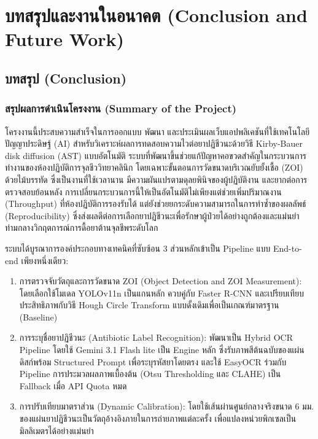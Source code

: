﻿%
\chapter{บทสรุปและงานในอนาคต (Conclusion and Future Work)}

\section{บทสรุป (Conclusion)}
\label{sec:conclusion}

\subsection{สรุปผลการดำเนินโครงงาน (Summary of the Project)}

โครงงานนี้ประสบความสำเร็จในการออกแบบ พัฒนา และประเมินผลเว็บแอปพลิเคชันที่ใช้เทคโนโลยีปัญญาประดิษฐ์ (AI) สำหรับวิเคราะห์ผลการทดสอบความไวต่อยาปฏิชีวนะด้วยวิธี Kirby-Bauer disk diffusion (AST) แบบอัตโนมัติ ระบบที่พัฒนาขึ้นช่วยแก้ปัญหาคอขวดสำคัญในกระบวนการทำงานของห้องปฏิบัติการจุลชีววิทยาคลินิก โดยเฉพาะขั้นตอนการวัดขนาดบริเวณยับยั้งเชื้อ (ZOI) ด้วยไม้บรรทัด ซึ่งเป็นงานที่ใช้เวลานาน มีความผันแปรตามดุลยพินิจของผู้ปฏิบัติงาน และยากต่อการตรวจสอบย้อนหลัง \cite{humphries2018} การเปลี่ยนกระบวนการนี้ให้เป็นอัตโนมัติไม่เพียงแต่ช่วยเพิ่มปริมาณงาน (Throughput) ที่ห้องปฏิบัติการรองรับได้ แต่ยังช่วยยกระดับความสามารถในการทำซ้ำของผลลัพธ์ (Reproducibility) ซึ่งส่งผลดีต่อการเลือกยาปฏิชีวนะเพื่อรักษาผู้ป่วยได้อย่างถูกต้องและแม่นยำ ท่ามกลางวิกฤตการณ์การดื้อยาต้านจุลชีพระดับโลก \cite{who_amr2022}

ระบบได้บูรณาการองค์ประกอบทางเทคนิคที่ซับซ้อน 3 ส่วนหลักเข้าเป็น Pipeline แบบ End-to-end เพียงหนึ่งเดียว:

\begin{enumerate}
  \item การตรวจจับวัตถุและการวัดขนาด ZOI (Object Detection and ZOI Measurement): โดยเลือกใช้โมเดล YOLOv11n เป็นแกนหลัก \cite{wang2024yolov11} ควบคู่กับ Faster R-CNN \cite{ren2015faster} และเปรียบเทียบประสิทธิภาพกับวิธี Hough Circle Transform แบบดั้งเดิมเพื่อเป็นเกณฑ์มาตรฐาน (Baseline)
  \item การระบุชื่อยาปฏิชีวนะ (Antibiotic Label Recognition): พัฒนาเป็น Hybrid OCR Pipeline โดยใช้ Gemini 3.1 Flash lite \cite{google2025gemini} เป็น Engine หลัก ซึ่งรับภาพสีต้นฉบับของแผ่นดิสก์พร้อม Structured Prompt เพื่อระบุรหัสยาโดยตรง และใช้ EasyOCR \cite{baek2019craft} ร่วมกับ Pipeline การประมวลผลภาพเบื้องต้น (Otsu Thresholding และ CLAHE) เป็น Fallback เมื่อ API Quota หมด
  \item การปรับเทียบมาตราส่วน (Dynamic Calibration): โดยใช้เส้นผ่านศูนย์กลางจริงขนาด 6 มม. ของแผ่นยาปฏิชีวนะเป็นวัตถุอ้างอิงภายในการถ่ายภาพแต่ละครั้ง เพื่อแปลงหน่วยพิกเซลเป็นมิลลิเมตรได้อย่างแม่นยำ
\end{enumerate}

